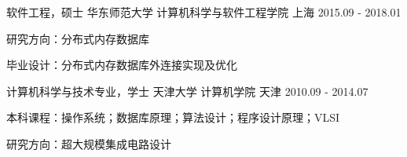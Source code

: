\begin{cventries}
  \cventry
    {软件工程，硕士}
    {华东师范大学 \quad 计算机科学与软件工程学院}
    {上海}
    {2015.09 - 2018.01}
    {
      \begin{cvitems}
        \item {研究方向：分布式内存数据库}
        \item {毕业设计：分布式内存数据库外连接实现及优化}
      \end{cvitems}
    }
    \cventry
    {计算机科学与技术专业，学士}
    {天津大学 \quad 计算机学院}
    {天津}
    {2010.09 - 2014.07}
    {
      \begin{cvitems}
	\item {本科课程：操作系统；数据库原理；算法设计；程序设计原理；VLSI}
        \item {研究方向：超大规模集成电路设计}
      \end{cvitems}
    }
\end{cventries}
